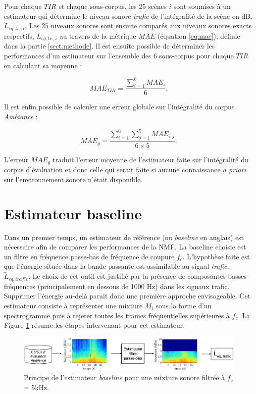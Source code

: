Pour chaque $TIR$ et chaque sous-corpus, les 25 scènes $i$ sont soumises à un estimateur qui détermine le niveau sonore \textit{trafic} de l'intégralité de la scène en dB,  $\tilde{L}_{eq,tr., i}$. Les 25 niveaux sonores sont ensuite comparés aux niveaux sonores exacts respectifs, $L_{eq,tr., i}$ au travers de la métrique $MAE$ (équation \ref{eq:mae}), définie dans la partie \ref{sect:methode}. Il est ensuite possible de déterminer les performances d'un estimateur sur l'ensemble des 6 sous-corpus pour chaque $TIR$ en calculant sa moyenne :

\begin{equation}\label{eq:mae_tir}
MAE_{TIR} = \frac{\sum_{i = 1}^6 MAE_{i}}{6}.
\end{equation}

Il est enfin possible de calculer une erreur globale sur l'intégralité du corpus \textit{Ambiance}  :

\begin{equation}\label{eq:mae_g}
MAE_{g} = \frac{\sum_{i = 1}^6 \sum_{j = 1}^5 MAE_{i,j}}{6 \times 5}.
\end{equation}

L'erreur $MAE_g$ traduit l'erreur moyenne de l'estimateur faite sur l'intégralité du corpus d'évaluation et donc celle qui serait faite si aucune connaissance \textit{a priori} sur l'environnement sonore n'était disponible.

\section{Estimateur baseline}
Dans un premier temps, un estimateur de référence (ou \textit{baseline} en anglais) est nécessaire afin de comparer les performances de la NMF. La baseline choisie est un filtre en fréquence passe-bas de fréquence de coupure $f_c$. L'hypothèse faite est que l'énergie située dans la bande passante est assimilable au signal \textit{trafic}, $\tilde{L}_{eq,trafic}$. Le choix de cet outil est justifié par la présence de composantes basses-fréquences (principalement en dessous de 1000 Hz) dans les signaux trafic. Supprimer l'énergie au-delà parait donc une première approche envisageable. %
Cet estimateur consiste à représenter une mixture $M_i$ sous la forme d'un spectrogramme puis à rejeter toutes les trames fréquentielles supérieures à $f_c$. La Figure \ref{fig:baseline} résume les étapes intervenant pour cet estimateur.

\begin{figure}[hbtp]
\centering
\includegraphics[width=\linewidth]{./figures/NMF/filtre_principe.pdf}
\caption{Principe de l'estimateur \textit{baseline}  pour une mixture sonore filtrée à $f_c$ = 5kHz.}
\label{fig:baseline}
\end{figure}

